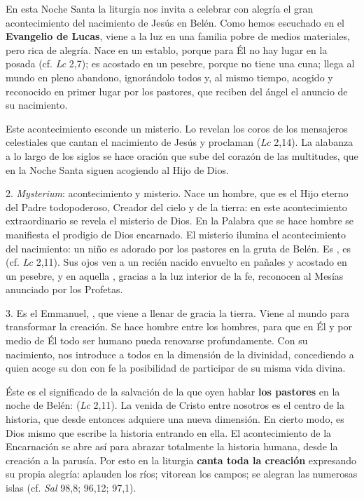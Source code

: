 En esta Noche Santa la liturgia nos invita a celebrar con alegría el gran acontecimiento del nacimiento de Jesús en Belén. Como hemos escuchado en el \textbf{Evangelio de Lucas}, viene a la luz en una familia pobre de medios materiales, pero rica de alegría. Nace en un establo, porque para Él no hay lugar en la posada (cf. \emph{Lc} 2,7); es acostado en un pesebre, porque no tiene una cuna; llega al mundo en pleno abandono, ignorándolo todos y, al mismo tiempo, acogido y reconocido en primer lugar por los pastores, que reciben del ángel el anuncio de su nacimiento.

Este acontecimiento esconde un misterio. Lo revelan los coros de los mensajeros celestiales que cantan el nacimiento de Jesús y proclaman  (\emph{Lc} 2,14). La alabanza a lo largo de los siglos se hace oración que sube del corazón de las multitudes, que en la Noche Santa siguen acogiendo al Hijo de Dios.

2. \emph{Mysterium}: acontecimiento y misterio. Nace un hombre, que es el Hijo eterno del Padre todopoderoso, Creador del cielo y de la tierra: en este acontecimiento extraordinario se revela el misterio de Dios. En la Palabra que se hace hombre se manifiesta el prodigio de Dios encarnado. El misterio ilumina el acontecimiento del nacimiento: un niño es adorado por los pastores en la gruta de Belén. Es , es  (cf. \emph{Lc} 2,11). Sus ojos ven a un recién nacido envuelto en pañales y acostado en un pesebre, y en aquella , gracias a la luz interior de la fe, reconocen al Mesías anunciado por los Profetas.

3. Es el Emmanuel, , que viene a llenar de gracia la tierra. Viene al mundo para transformar la creación. Se hace hombre entre los hombres, para que en Él y por medio de Él todo ser humano pueda renovarse profundamente. Con su nacimiento, nos introduce a todos en la dimensión de la divinidad, concediendo a quien acoge su don con fe la posibilidad de participar de su misma vida divina.

Éste es el significado de la salvación de la que oyen hablar \textbf{los pastores} en la noche de Belén:  (\emph{Lc} 2,11). La venida de Cristo entre nosotros es el centro de la historia, que desde entonces adquiere una nueva dimensión. En cierto modo, es Dios mismo que escribe la historia entrando en ella. El acontecimiento de la Encarnación se abre así para abrazar totalmente la historia humana, desde la creación a la parusía. Por esto en la liturgia \textbf{canta toda la creación} expresando su propia alegría: aplauden los ríos; vitorean los campos; se alegran las numerosas islas (cf. \emph{Sal} 98,8; 96,12; 97,1).

